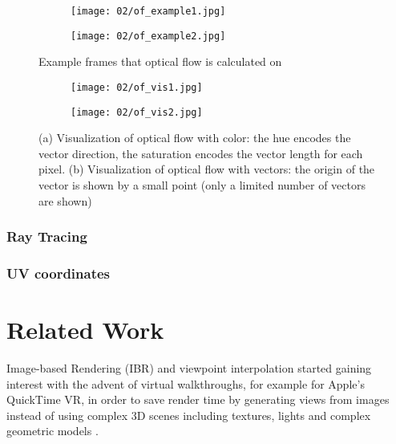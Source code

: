 \begin{figure}
\centering
    \begin{subfigure}[b]{0.5\textwidth}            
            \centering
            \texttt{[image: 02/of\_example1.jpg]}
            \caption{}
    \end{subfigure}%
    \begin{subfigure}[b]{0.5\textwidth}
            \centering
            \texttt{[image: 02/of\_example2.jpg]}
            \caption{}
    \end{subfigure}
    \caption[Optical flow example]{Example frames that optical flow is calculated on}\label{fig:of_example_bike}

    \quad
    \begin{subfigure}[b]{0.5\textwidth}            
            \centering
            \texttt{[image: 02/of\_vis1.jpg]}
            \caption{}
    \end{subfigure}%
    \begin{subfigure}[b]{0.5\textwidth}
            \centering
            \texttt{[image: 02/of\_vis2.jpg]}
            \caption{}
    \end{subfigure}
    \caption[Optical flow visualizations]{(a) Visualization of optical flow with color: the hue encodes the vector direction, the saturation encodes the vector length for each pixel. (b) Visualization of optical flow with vectors: the origin of the vector is shown by a small point (only a limited number of vectors are shown)}\label{fig:of_vis}
\end{figure}

\subsubsection{Ray Tracing}
\subsubsection{UV coordinates}

\section{Related Work}
Image-based Rendering (IBR) and viewpoint interpolation started gaining interest with the advent of virtual walkthroughs, for example for Apple's QuickTime\textsuperscript{\textregistered} VR, in order to save render time by generating views from images instead of using complex 3D scenes including textures, lights and complex geometric models \cite{quicktime}.

